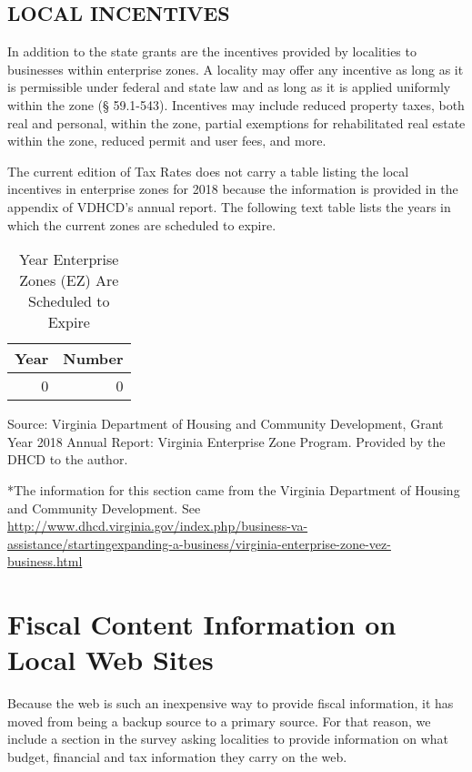 \documentclass[
]{book}
\begin{document}
\hypertarget{local-incentives}{%
\section{LOCAL INCENTIVES}\label{local-incentives}}

In addition to the state grants are the incentives provided by localities to businesses within enterprise zones. A locality may offer any incentive as long as it is permissible under federal and state law and as long as it is applied uniformly within the zone (§ 59.1-543). Incentives may include reduced property taxes, both real and personal, within the zone, partial exemptions for rehabilitated real estate within the zone, reduced permit and user fees, and more.

The current edition of Tax Rates does not carry a table listing the local incentives in enterprise zones for 2018 because the information is provided in the appendix of VDHCD's annual report. The following text table lists the years in which the current zones are scheduled to expire.

\begin{table}

\caption{\label{tab:unnamed-chunk-2}Year Enterprise Zones (EZ) Are Scheduled to Expire}
\centering
\begin{tabular}[t]{r|r}
\hline
Year & Number\\
\hline
0 & 0\\
\hline
\end{tabular}
\end{table}

Source: Virginia Department of Housing and Community Development, Grant Year 2018 Annual Report: Virginia Enterprise Zone Program. Provided by the DHCD to the author.

*The information for this section came from the Virginia Department of Housing and Community Development. See \url{http://www.dhcd.virginia.gov/index.php/business-va-assistance/startingexpanding-a-business/virginia-enterprise-zone-vez-business.html}

\hypertarget{fiscal-content-information-on-local-web-sites}{%
\chapter{Fiscal Content Information on Local Web Sites}\label{fiscal-content-information-on-local-web-sites}}

Because the web is such an inexpensive way to provide fiscal information, it has moved from being a backup source to a primary source. For that reason, we include a section in the survey asking localities to provide information on what budget, financial and tax information they carry on the web.
\end{document}
